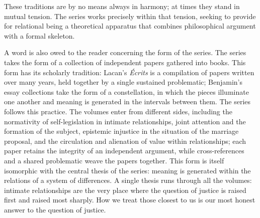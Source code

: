 These traditions are by no means always in harmony; at times they stand in mutual tension. The series works precisely within that tension, seeking to provide for relational being a theoretical apparatus that combines philosophical argument with a formal skeleton.

A word is also owed to the reader concerning the form of the series. The series takes the form of a collection of independent papers gathered into books. This form has its scholarly tradition: Lacan's \emph{\'Ecrits} is a compilation of papers written over many years, held together by a single sustained problematic; Benjamin's essay collections take the form of a constellation, in which the pieces illuminate one another and meaning is generated in the intervals between them. The series follows this practice. The volumes enter from different sides, including the normativity of self-legislation in intimate relationships, joint attention and the formation of the subject, epistemic injustice in the situation of the marriage proposal, and the circulation and alienation of value within relationships; each paper retains the integrity of an independent argument, while cross-references and a shared problematic weave the papers together. This form is itself isomorphic with the central thesis of the series: meaning is generated within the relations of a system of differences. A single thesis runs through all the volumes: intimate relationships are the very place where the question of justice is raised first and raised most sharply. How we treat those closest to us is our most honest answer to the question of justice.

